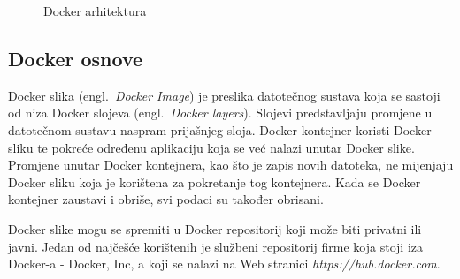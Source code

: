 \begin{figure}[h]
    \centering

    \caption{Docker arhitektura}%
    \label{fig:02docker}
\end{figure}

\subsection{Docker osnove}
Docker slika (engl.~\textit{Docker Image}) je preslika datotečnog sustava koja se sastoji od niza
Docker slojeva (engl.~\textit{Docker layers}). Slojevi predstavljaju promjene u datotečnom sustavu
naspram prijašnjeg sloja. Docker kontejner koristi Docker sliku te pokreće određenu aplikaciju koja
se već nalazi unutar Docker slike. Promjene unutar Docker kontejnera, kao što je zapis novih
datoteka, ne mijenjaju Docker sliku koja je korištena za pokretanje tog kontejnera. Kada se Docker
kontejner zaustavi i obriše, svi podaci su također obrisani.

Docker slike mogu se spremiti u Docker repositorij koji može biti privatni ili javni. Jedan od
najčešće korištenih je službeni repositorij firme koja stoji iza Docker-a - Docker, Inc, a koji se
nalazi na Web stranici \textit{https://hub.docker.com}. 


